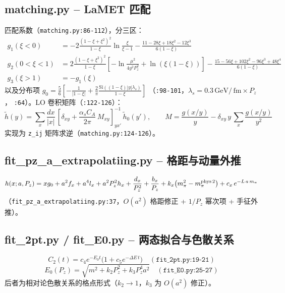 \documentclass[UTF8]{ctexart}
\begin{document}
\subsection{matching.py -- LaMET 匹配}

匹配系数（\texttt{matching.py:86-112}），分三区：
\begin{align}
  g_1(\xi<0) &= -2\frac{(1-\xi+\xi^2)^2}{1-\xi}\ln\frac{\xi}{\xi-1}
  - \frac{11-28\xi+18\xi^2-12\xi^3}{6(1-\xi)} \\
  g_2(0<\xi<1) &= 2\frac{(1-\xi+\xi^2)^2}{1-\xi}
  \left[-\ln\frac{\mu^2}{4y^2P_z^2}+\ln(\xi(1-\xi))\right]
  - \frac{15-56\xi+102\xi^2-96\xi^3+48\xi^4}{6(1-\xi)} \\
  g_3(\xi>1) &= -g_1(\xi)
\end{align}
以及分布项 $g_0 = \frac56\left[-\frac{1}{|1-\xi|} + \frac{2}{\pi}\frac{\mathrm{Si}((1-\xi)|y|\lambda_s)}{1-\xi}\right]$
（\texttt{:98-101}，$\lambda_s = 0.3\,\mathrm{GeV}/\,\text{fm}\times P_z$，
\texttt{:64}）。LO 卷积矩阵（\texttt{:122-126}）：
\begin{equation}
  \tilde h(y) = \sum_x \frac{dx}{|x|}\,
  \left[\delta_{xy} + \frac{\alpha_s C_A}{2\pi}\,M_{xy}\right]^{-1}_{yx'}\,
  \tilde h_0(y'), \qquad
  M = \frac{g(x/y)}{y} - \delta_{xy}\,y\,\sum_{x}\frac{g(x/y)}{y^2}
\end{equation}
实现为 \texttt{z\_ij} 矩阵求逆（\texttt{matching.py:124-126}）。

\subsection{fit\_pz\_a\_extrapolatiing.py -- 格距与动量外推}

\begin{equation}
  h(x;a,P_z) = xg_0 + a^2 f_x + a^4 l_x + a^2P_z^2 h_x
  + \frac{d_x}{P_z^2} + \frac{b_x}{P_z}
  + k_x\big(m_\pi^2 - m_\pi^{\rm phys\,2}\big) + c_x\,e^{-L\,a\,m_\pi}
\end{equation}
（\texttt{fit\_pz\_a\_extrapolatiing.py:37}，$O(a^2)$ 格距修正 +
$1/P_z$ 幂次项 + 手征外推）。

\subsection{fit\_2pt.py / fit\_E0.py -- 两态拟合与色散关系}

\begin{equation}
  C_2(t) = c_4 e^{-E_0 t}\big(1 + c_5 e^{-\Delta E\,t}\big)
  \quad(\texttt{fit\_2pt.py:19-21})
\end{equation}
\begin{equation}
  E_0(P_z) = \sqrt{m^2 + k_2 P_z^2 + k_3 P_z^4 a^2}
  \quad(\texttt{fit\_E0.py:25-27})
\end{equation}
后者为相对论色散关系的格点形式（$k_2\to 1$，$k_3$ 为 $O(a^2)$ 修正）。
\end{document}
